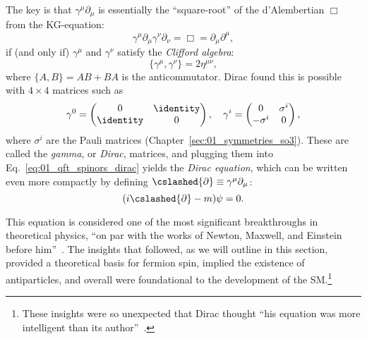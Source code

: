 The key is that $\gamma^\mu\partial_\mu$ is essentially the ``square-root'' of the d'Alembertian $\Box$ from the KG-equation:
\begin{equation}
	\label{eq:01_qft_spinors_dirac_wave}
	\gamma^\mu \partial_\mu \gamma^\nu \partial_\nu = \Box = \partial_\mu \partial^\mu,
\end{equation}
if (and only if) $\gamma^\mu$ and $\gamma^\nu$ satisfy the \textit{Clifford algebra}:
\begin{equation}
	\label{eq:01_qft_spinors_clifford_algebra}
	\{\gamma^\mu, \gamma^\nu\} = 2\eta^{\mu\nu},
\end{equation}
where $\{A, B\} = AB + BA$ is the anticommutator.
Dirac found this is possible with $4\times 4$ matrices such as
\begin{equation}
	\label{eq:01_qft_spinors_gamma_matrices_weyl_basis}
	\gamma^0 = \begin{pmatrix} 0 & \identity \\ \identity & 0 \end{pmatrix}, \quad 
	\gamma^i = \begin{pmatrix} 0 & \sigma^i \\ -\sigma^i & 0 \end{pmatrix},
\end{equation}
where $\sigma^i$ are the Pauli matrices (Chapter~\ref{sec:01_symmetries_so3}).
These are called the \textit{gamma}, or \textit{Dirac}, matrices, and plugging them into Eq.~\ref{eq:01_qft_spinors_dirac} yields the \textit{Dirac equation}, which can be written even more compactly by defining $\cslashed{\partial} \equiv \gamma^\mu \partial_\mu$:
\begin{equation}
	\label{eq:01_qft_spinors_dirac_slash}
	(i\cslashed{\partial} - m)\psi = 0.
\end{equation}

This equation is considered one of the most significant breakthroughs in theoretical physics, ``on par with the works of Newton, Maxwell, and Einstein before him''~\cite{hey2003new}.
The insights that followed, as we will outline in this section, provided a theoretical basis for fermion spin, implied the existence of antiparticles, and overall were foundational to the development of the SM.\footnote{These insights were so unexpected that Dirac thought ``his equation was more intelligent than its author''~\cite{brown1983birth}.}


